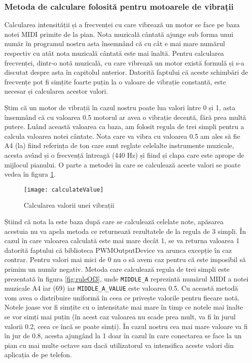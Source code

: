 \documentclass[../IoMusT.tex]{subfiles}
\begin{document}
\subsubsection{Metoda de calculare folosită pentru motoarele de vibrații}
Calcularea intensității și a frecvenței cu care vibrează un motor se face pe baza notei MIDI primite de la pian. Nota muzicală cântată ajunge sub forma unui număr în programul nostru asta însemnând că cu cât e mai mare numărul respectiv cu atât nota muzicală cântată este mai înaltă. Pentru calcularea frecvenței, dintr-o notă muzicală, cu care vibrează un motor există formulă și s-a discutat despre asta în capitolul anterior. Datorită faptului că aceste schimbări de frecvențe pot fi simțite foarte puțin la o valoare de vibrație constantă, este necesar și calcularea acestor valori.
\\
\par Știm că un motor de vibrații în cazul nostru poate lua valori între 0 și 1, asta însemnând că cu valoarea 0.5 motorul ar avea o vibrație decentă, fără prea multă putere. Luând această valoarea ca baza, am folosit regula de trei simpli pentru a calcula valoarea notei cântate. Nota care va vibra cu valoarea 0.5 am ales să fie A4 (la) fiind referința de ton care sunt reglate celelalte instrumente muzicale, acesta având și o frecvență întreagă (440 Hz) și fiind și clapa care este aprope de mijlocul pianului. O parte a metodei în care se calculează aceste valori se poate vedea în figura \ref{fig:calculateValue}.
\begin{figure}[h]
\centering
\texttt{[image: calculateValue]}
\caption{Calcularea valorii unei vibrații}
\label{fig:calculateValue}
\end{figure}  
 Știind că nota la este baza după care se calculează celelate note, apăsarea acestuia nu va apela metoda ce returnează rezultatele de la regula de 3 simpli. În cazul în care valoarea calculată este mai mare decât 1, se va returna valoarea 1 datorită faptului că biblioteca PWMOutputDevice va arunca excepție în caz contrar. Pentru valori mai mici de 0 nu o să avem caz pentru că este imposibil să primim un număr negativ. Metoda care calculează regula de trei simpli este prezentată în figura \ref{fig:ruleOf3}, unde \verb|MIDDLE_A| reprezintă numărul MIDI a notei muzicale A4 iar (69) iar \verb|MIDDLE_A_VALUE| este valoarea 0.5. Cu această metodă vom avea o distribuire uniformă în ceea ce privește valorile pentru fiecare notă. Notele joase vor fi simțite cu o intensitate mai mare în timp ce notele mai înalte se vor simți mai puțin (în acest caz valoarea nu scade prea mult, va fi în jurul valorii 0.2, ceea ce încă se poate simți). În cazul nostru cea mai mare valoare va fi în jur de 0.8, acesta ajungând la 1 doar în cazul în care conectarea se face la un pian cu mai multe octave sau dacă utilizatorul va intensifica aceste valori din aplicația de pe telefon.
\end{document}

